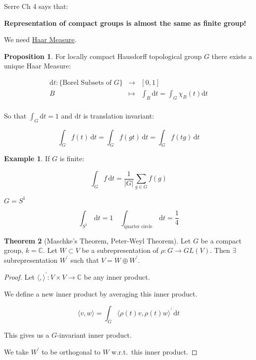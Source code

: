\documentclass{article}
\theoremstyle{definition}
\newtheorem*{example}{Example}
\newtheorem{theorem}{Theorem}
\newtheorem{proposition}[theorem]{Proposition}
\begin{document}
Serre Ch 4 says that:

\begin{center}

\textbf{Representation of compact groups is almost the same as finite group!}

\end{center}

We need \underline{Haar Measure}.

\begin{proposition}


    For locally compact Hausdorff topological group \(G\) there exists a unique Haar Measure:

    \[
        \begin{array}{rcl}
            \mathrm{d}t: \{ \text{Borel Subsets of $G$} \} & \to & [0,1] \\
            B & \mapsto & \int_B \mathrm{d}t = \int_G \chi_B(t) \mathrm{d}t \\
        \end{array}
    \]

    So that \(\int_G \mathrm{d}t = 1\) and \(\mathrm{d}t\) is translation invariant:

    \[
        \int_G f(t) \, \mathrm{d}t = \int_G f(gt) \, \mathrm{d}t = \int_G f(tg) \, \mathrm{d}t
    \]
    
\end{proposition}

\begin{example}
    If \(G\) is finite:

    \[
        \int_G f \, \mathrm{d}t = \frac{1}{\vert G \vert} \sum_{g\in G} f(g)
    \]

    \(G = S^1\) 

    \[
        \int_{S^1} \, \mathrm{d}t = 1 \quad \int_{\text{quarter circle}} \, \mathrm{d}t = \frac{1}{4}
    \]
\end{example}

\begin{theorem}
    [Maschke's Theorem, Peter-Weyl Theorem] Let \(G\) be a compact group, \(k = \mathbb{C}\). Let \(W \subset V\) be a subrepresentation of \(\rho : G \to GL(V)\). Then \(\exists\) subrepresentation \(W^{\prime}\) such that \(V = W \oplus W^{\prime}\).
\end{theorem}

\begin{proof}
    Let \(\langle , \rangle ^{\prime} : V \times V \to \mathbb{C}\) be any inner product.

    We define a new inner product by averaging this inner product.

    \[
        \langle v,w \rangle = \int_G \langle \rho (t) v, \rho(t) w \rangle^{\prime} \, \mathrm{d}t
    \]

    This gives us a \(G\)-invariant inner product.

    We take \(W^{\prime}\) to be orthogonal to \(W\) w.r.t.\ this inner product.
\end{proof}
\end{document}
